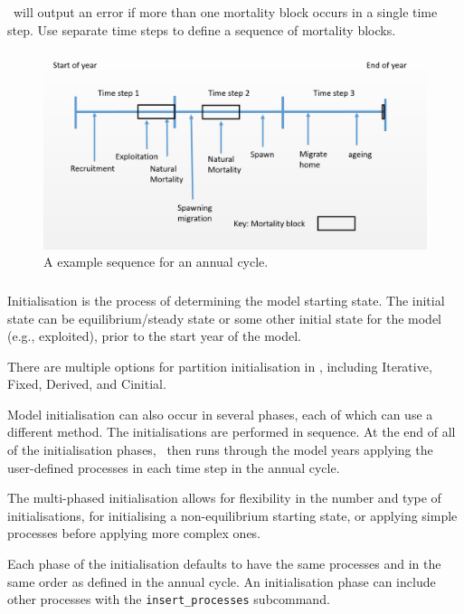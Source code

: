 \CNAME\ will output an error if more than one mortality block occurs in a single time step. Use separate time steps to define a sequence of mortality blocks.

\begin{figure}[H]
	\centering
	\includegraphics[scale=0.5]{Figures/annual_cycle.jpg}
	\caption{A example sequence for an annual cycle.}\label{Fig:annual}
\end{figure}

\subsubsection{}\label{subsec:initialisation}

Initialisation is the process of determining the model starting state. The initial state can be equilibrium/steady state or some other initial state for the model (e.g., exploited), prior to the start year of the model.

There are multiple options for partition initialisation in \CNAME, including Iterative, Fixed, Derived, and Cinitial.

Model initialisation can also occur in several phases, each of which can use a different method. The initialisations are performed in sequence. At the end of all of the initialisation phases, \CNAME\ then runs through the model years applying the user-defined processes in each time step in the annual cycle.

The multi-phased initialisation allows for flexibility in the number and type of initialisations, for initialising a non-equilibrium starting state, or applying simple processes before applying more complex ones.

Each phase of the initialisation defaults to have the same processes and in the same order as defined in the annual cycle. An initialisation phase can include other processes with the \texttt{insert\_processes} subcommand.

